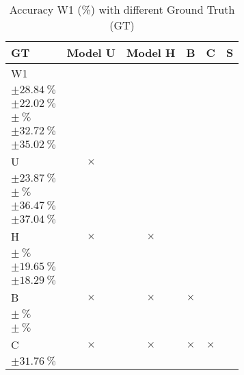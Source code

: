 \begin{table}[H]
\small
\centering
\caption{\label{tab:base3dRPEdatamask}%
  Accuracy W1 (\%) with different Ground Truth (GT)
}
\begin{tabular}{lccccc}
  \toprule
  GT & Model U                                                         & Model H                                                         & B                                                     & C                                                               & S \\
  \midrule
  W1 & \makecell{$\SI{75.31}{\percent}$ \\ $\pm \SI{28.84}{\percent}$} & \makecell{$\SI{25.05}{\percent}$ \\ $\pm \SI{22.02}{\percent}$} & \makecell{$\SI{}{\percent}$ \\ $\pm \SI{}{\percent}$} & \makecell{$\SI{50.78}{\percent}$ \\ $\pm \SI{32.72}{\percent}$} & \makecell{$\SI{38.16}{\percent}$ \\ $\pm \SI{35.02}{\percent}$} \\
  U & $\times$                                                         & \makecell{$\SI{25.57}{\percent}$ \\ $\pm \SI{23.87}{\percent}$} & \makecell{$\SI{}{\percent}$ \\ $\pm \SI{}{\percent}$} & \makecell{$\SI{49.61}{\percent}$ \\ $\pm \SI{36.47}{\percent}$} & \makecell{$\SI{38.73}{\percent}$ \\ $\pm \SI{37.04}{\percent}$} \\
  H & $\times$                                                         & $\times$                                                        & \makecell{$\SI{}{\percent}$ \\ $\pm \SI{}{\percent}$} & \makecell{$\SI{41.98}{\percent}$ \\ $\pm \SI{19.65}{\percent}$} & \makecell{$\SI{82.51}{\percent}$ \\ $\pm \SI{18.29}{\percent}$} \\
  B & $\times$                                                         & $\times$                                                        & $\times$                                              & \makecell{$\SI{}{\percent}$ \\ $\pm \SI{}{\percent}$}           & \makecell{$\SI{}{\percent}$ \\ $\pm \SI{}{\percent}$}           \\
  C & $\times$                                                         & $\times$                                                        & $\times$                                              & $\times$                                                        & \makecell{$\SI{54.47}{\percent}$ \\ $\pm \SI{31.76}{\percent}$} \\

\end{tabular}
\end{table}
